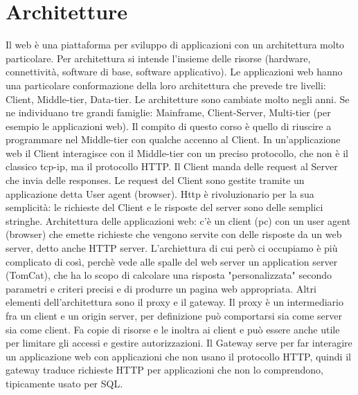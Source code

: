 \section{Architetture}
Il web è una piattaforma per sviluppo di applicazioni con un architettura molto particolare. Per architettura si intende l'insieme delle risorse (hardware, connettività, software di base, software applicativo).\newline
Le applicazioni web hanno una particolare conformazione della loro architettura che prevede tre livelli: Client, Middle-tier, Data-tier.\newline 
Le architetture sono  cambiate molto negli anni. Se ne individuano tre grandi famiglie: Mainframe, Client-Server, Multi-tier (per esempio le applicazioni web). \newline
Il compito di questo corso è quello di riuscire a programmare nel Middle-tier con qualche accenno al Client.
In un'applicazione web il Client interagisce con il Middle-tier con un preciso protocollo, che non è il classico tcp-ip, ma il protocollo HTTP.\newline
Il Client manda delle request al Server che invia delle responses. Le request del Client sono gestite tramite un applicazione detta User agent (browser).\newline
Http è rivoluzionario per la sua semplicità: le richieste del Client e le risposte del server sono delle semplici stringhe. \newline
Architettura delle applicazioni web: c'è un client (pc) con un user agent (browser) che emette richieste che vengono servite con delle risposte da un web server, detto anche HTTP server. L'archiettura di cui però ci occupiamo è più complicato di così, perchè vede alle spalle del web server un application server (TomCat), che ha lo scopo di calcolare una risposta "personalizzata" secondo parametri e criteri precisi e di produrre un pagina web appropriata.\newline
Altri elementi dell'architettura sono il proxy e il gateway. Il proxy è un intermediario fra un client e un origin server, per definizione può comportarsi sia come server sia come client. Fa copie di risorse e le inoltra ai client e può essere anche utile per limitare gli accessi e gestire autorizzazioni. Il Gateway serve per far interagire un applicazione web con applicazioni che non usano il protocollo HTTP, quindi il gateway traduce richieste HTTP per applicazioni che non lo comprendono, tipicamente usato per SQL.
